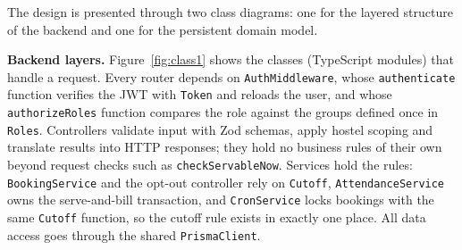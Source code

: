 \documentclass[11pt,a4paper]{article}
\begin{document}
The design is presented through two class diagrams: one for the layered
structure of the backend and one for the persistent domain model.

\textbf{Backend layers.} Figure~\ref{fig:class1} shows the classes (TypeScript
modules) that handle a request. Every router depends on
\texttt{AuthMiddleware}, whose \texttt{authenticate} function verifies the JWT
with \texttt{Token} and reloads the user, and whose \texttt{authorizeRoles}
function compares the role against the groups defined once in \texttt{Roles}.
Controllers validate input with Zod schemas, apply hostel scoping and translate
results into HTTP responses; they hold no business rules of their own beyond
request checks such as \texttt{checkServableNow}. Services hold the rules:
\texttt{BookingService} and the opt-out controller rely on \texttt{Cutoff},
\texttt{AttendanceService} owns the serve-and-bill transaction, and
\texttt{CronService} locks bookings with the same \texttt{Cutoff} function, so
the cutoff rule exists in exactly one place. All data access goes through the
shared \texttt{PrismaClient}.
\end{document}
